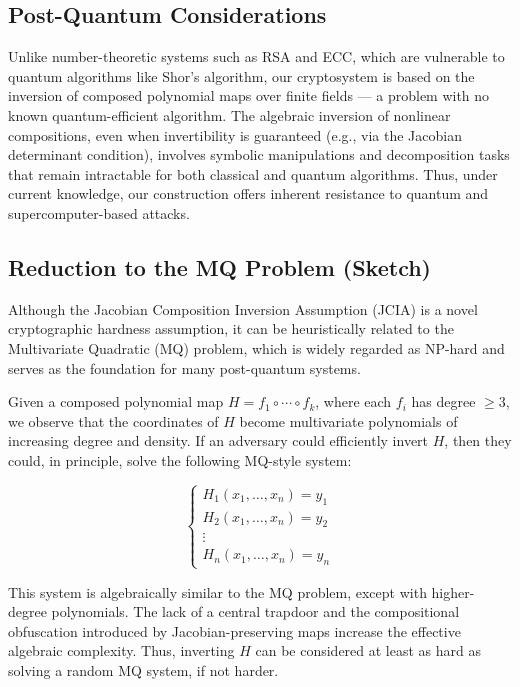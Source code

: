 \documentclass[12pt]{article}
\begin{document}
\subsection*{Post-Quantum Considerations}

Unlike number-theoretic systems such as RSA and ECC, which are vulnerable to quantum algorithms like Shor's algorithm, our cryptosystem is based on the inversion of composed polynomial maps over finite fields — a problem with no known quantum-efficient algorithm. The algebraic inversion of nonlinear compositions, even when invertibility is guaranteed (e.g., via the Jacobian determinant condition), involves symbolic manipulations and decomposition tasks that remain intractable for both classical and quantum algorithms. Thus, under current knowledge, our construction offers inherent resistance to quantum and supercomputer-based attacks.

\subsection*{Reduction to the MQ Problem (Sketch)}

Although the Jacobian Composition Inversion Assumption (JCIA) is a novel cryptographic hardness assumption, it can be heuristically related to the Multivariate Quadratic (MQ) problem, which is widely regarded as NP-hard and serves as the foundation for many post-quantum systems.

Given a composed polynomial map \( H = f_1 \circ \cdots \circ f_k \), where each \( f_i \) has degree \( \geq 3 \), we observe that the coordinates of \( H \) become multivariate polynomials of increasing degree and density. If an adversary could efficiently invert \( H \), then they could, in principle, solve the following MQ-style system:

\[
\begin{cases}
H_1(x_1, \ldots, x_n) = y_1 \\
H_2(x_1, \ldots, x_n) = y_2 \\
\vdots \\
H_n(x_1, \ldots, x_n) = y_n
\end{cases}
\]

This system is algebraically similar to the MQ problem, except with higher-degree polynomials. The lack of a central trapdoor and the compositional obfuscation introduced by Jacobian-preserving maps increase the effective algebraic complexity. Thus, inverting \( H \) can be considered at least as hard as solving a random MQ system, if not harder.
\end{document}
